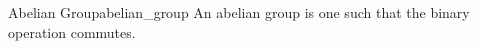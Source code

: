 \begin{definition}{Abelian Group}{abelian_group}
An abelian group is one such that the binary operation commutes.
\end{definition}
